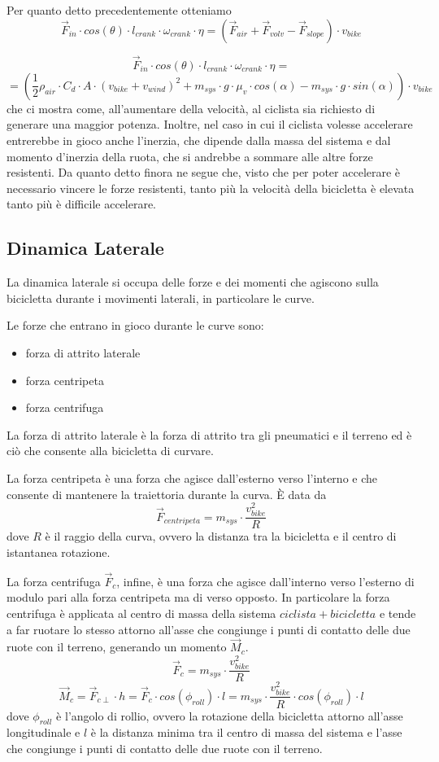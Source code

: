 \documentclass[class=article]{standalone}
\begin{document}
	Per quanto detto precedentemente otteniamo
	\[\vec{F}_{in}\cdot cos(\theta)\cdot l_{crank}\cdot \omega_{crank}\cdot\eta=(\vec{F}_{air}+\vec{F}_{volv}-\vec{F}_{slope})\cdot v_{bike}\]
	
	\[\vec{F}_{in}\cdot cos(\theta)\cdot l_{crank}\cdot \omega_{crank}\cdot\eta=\]
	\[=(\frac{1}{2}\rho_{air}\cdot C_{d}\cdot A\cdot (v_{bike}+v_{wind})^2+m_{sys}\cdot g\cdot \mu_{v}\cdot cos(\alpha)-m_{sys}\cdot g\cdot sin(\alpha))\cdot v_{bike}\]
	che ci mostra come, all'aumentare della velocità, al ciclista sia richiesto di generare una maggior potenza. Inoltre, nel caso in cui il ciclista volesse accelerare entrerebbe in gioco anche l'inerzia, che dipende dalla massa del sistema e dal momento d'inerzia della ruota, che si andrebbe a sommare alle altre forze resistenti.
	Da quanto detto finora ne segue che, visto che per poter accelerare è necessario vincere le forze resistenti, tanto più la velocità della bicicletta è elevata tanto più è difficile accelerare.
			
	\subsection{Dinamica Laterale}
	La dinamica laterale si occupa delle forze e dei momenti che agiscono sulla bicicletta durante i movimenti laterali, in particolare le curve.
	
	Le forze che entrano in gioco durante le curve sono:
	\begin{itemize}
		\item forza di attrito laterale
		\item forza centripeta
		\item forza centrifuga
	\end{itemize}
	
	La forza di attrito laterale è la forza di attrito tra gli pneumatici e il terreno ed è ciò che consente alla bicicletta di curvare.
	
	La forza centripeta	è una forza che agisce dall'esterno verso l'interno e che consente di mantenere la traiettoria durante la curva. È data da
	\[\vec{F}_{centripeta}=m_{sys}\cdot\frac{v_{bike}^2}{R}\]
	dove \(R\) è il raggio della curva, ovvero la distanza tra la bicicletta e il centro di istantanea rotazione.
	
	La forza centrifuga \(\vec{F}_{c}\), infine, è una forza che agisce dall'interno verso l'esterno di modulo pari alla forza centripeta ma di verso opposto.
	In particolare la forza centrifuga è applicata al centro di massa della sistema \(ciclista + bicicletta\) e tende a far ruotare lo stesso attorno all'asse che congiunge i punti di contatto delle due ruote con il terreno, generando un momento \(\vec{M}_{c}\).
	\[\vec{F}_{c}=m_{sys}\cdot\frac{v_{bike}^2}{R}\]
	\[\vec{M}_{c}=\vec{F}_{c\perp}\cdot h=\vec{F}_{c}\cdot cos(\phi_{roll})\cdot l=m_{sys}\cdot\frac{v_{bike}^2}{R}\cdot cos(\phi_{roll})\cdot l\]
	dove \(\phi_{roll}\) è l'angolo di rollio, ovvero la rotazione della bicicletta attorno all'asse longitudinale e \(l\) è la distanza minima tra il centro di massa del sistema e l'asse che congiunge i punti di contatto delle due ruote con il terreno.
	
\end{document}
